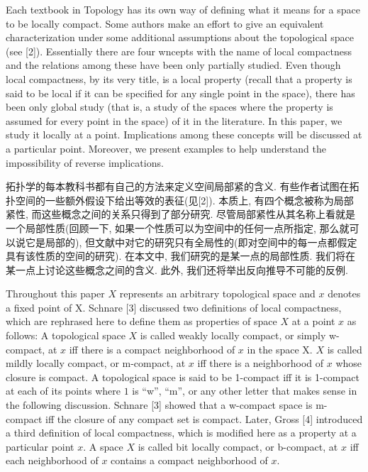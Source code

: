 \documentclass[options]{article}
\begin{document}
\begin{paracol}{2}
	\begin{en}
		Each textbook in Topology has its own way of defining what it means for a space to be locally compact. Some authors make an effort to give an equivalent characterization under some additional assumptions about the topological space (see [2]). Essentially there are four wncepts with the name of local compactness and the relations among these have been only partially studied. Even though local compactness, by its very title, is a local property (recall that a property is said to be local if it can be specified for any single point in the space), there has been only global study (that is, a study of the spaces where the property is assumed for every point in the space) of it in the literature. In this paper, we study it locally at a point. Implications among these concepts will be discussed at a particular point. Moreover, we present examples to help understand the impossibility of reverse implications.
	\end{en}
	\begin{cn}
		拓扑学的每本教科书都有自己的方法来定义空间局部紧的含义. 有些作者试图在拓扑空间的一些额外假设下给出等效的表征(见[2]). 本质上, 有四个概念被称为局部紧性, 而这些概念之间的关系只得到了部分研究. 尽管局部紧性从其名称上看就是一个局部性质(回顾一下, 如果一个性质可以为空间中的任何一点所指定, 那么就可以说它是局部的), 但文献中对它的研究只有全局性的(即对空间中的每一点都假定具有该性质的空间的研究). 在本文中, 我们研究的是某一点的局部性质. 我们将在某一点上讨论这些概念之间的含义. 此外, 我们还将举出反向推导不可能的反例.
	\end{cn}
	\begin{en}
		Throughout this paper $X$ represents an arbitrary topological space and $x$ denotes a fixed point of X. Schnare [3] discussed two definitions of local compactness, which are rephrased here to define them as properties of space $X$ at a point $x$ as follows: A topological space $X$ is called weakly locally compact, or simply w-compact, at $x$ iff there is a compact neighborhood of $x$ in the space X. $X$ is called mildly locally compact, or m-compact, at $x$ iff there is a neighborhood of $x$ whose closure is compact. A topological space is said to be 1-compact iff it is 1-compact at each of its points where $1$ is ``w'', ``m'', or any other letter that makes sense in the following discussion. Schnare [3] showed that a w-compact space is m-compact iff the closure of any compact set is compact. Later, Gross [4] introduced a third definition of local compactness, which is modified here as a property at a particular point $x$. A space $X$ is called bit locally compact, or b-compact, at $x$ iff each neighborhood of $x$ contains a compact neighborhood of $x$.

\end{en}
\end{paracol}
\end{document}
